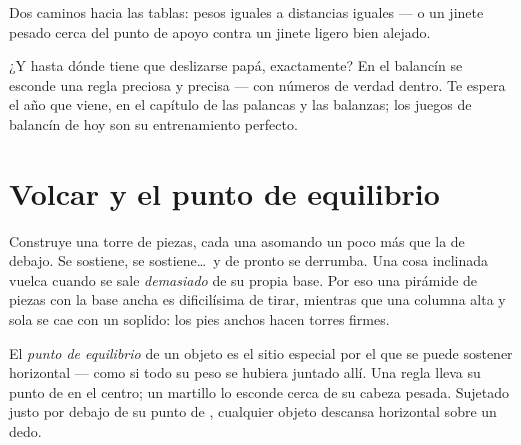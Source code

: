 \begin{omfigure}

{\small Dos caminos hacia las tablas: pesos iguales a distancias
iguales --- o un jinete pesado cerca del punto de apoyo contra un
jinete ligero bien alejado.}
\end{omfigure}

\begin{remark}\label{rem:g2:balance-equilibrium:promise}
¿Y hasta dónde tiene que deslizarse papá, exactamente? En el balancín
se esconde una regla preciosa y precisa --- con números de verdad
dentro. Te espera el año que viene, en el capítulo de las palancas y
las balanzas; los juegos de balancín de hoy son su entrenamiento
perfecto.
\end{remark}

\section{Volcar y el punto de equilibrio}

\begin{example}\label{ex:g2:balance-equilibrium:tower}
Construye una torre de piezas, cada una asomando un poco más que la de
debajo. Se sostiene, se sostiene\dots\ y de pronto se derrumba. Una
cosa inclinada vuelca cuando se sale \emph{demasiado} de su propia
base. Por eso una pirámide de piezas con la base ancha es dificilísima
de tirar, mientras que una columna alta y sola se cae con un soplido:
los pies anchos hacen torres firmes.
\end{example}

\begin{definition}\label{def:g2:balance-equilibrium:point}
El \emph{punto de equilibrio} de un objeto
es el sitio especial por el que se puede sostener horizontal --- como
si todo su peso se hubiera juntado allí. Una regla lleva su punto de
 en el centro; un martillo lo esconde cerca de su cabeza
pesada. Sujetado justo por debajo de su punto de ,
cualquier objeto descansa horizontal sobre un dedo.
\end{definition}

